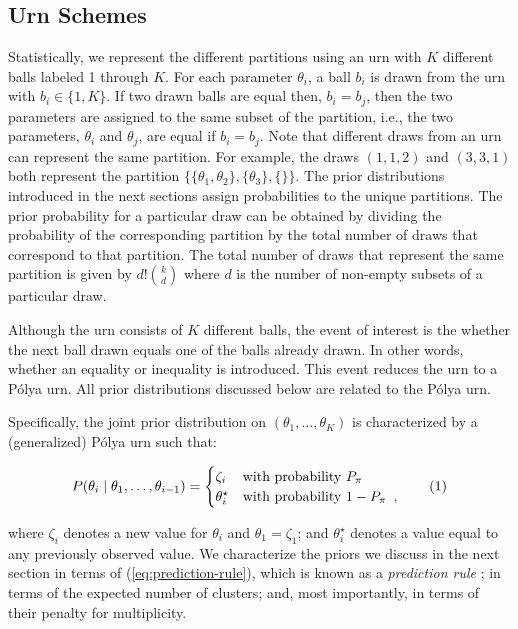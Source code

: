 \documentclass[11pt,a4paper]{article}
\theoremstyle{definition} %
\theoremstyle{case}
\newcommand{\numberthis}{\addtocounter{equation}{1}\tag{\theequation}}
\begin{document}
\subsection{Urn Schemes}
Statistically, we represent the different partitions using an urn with $K$ different balls labeled 1 through $K$. For each parameter $\theta_i$, a ball $b_i$ is drawn from the urn with $b_i \in \{1,K\}$. If two drawn balls are equal then, $b_i = b_j$, then the two parameters are assigned to the same subset of the partition, i.e., the two parameters, $\theta_i$ and $\theta_j$, are equal if $b_i = b_j$. Note that different draws from an urn can represent the same partition. For example, the draws $(1, 1, 2)$ and $(3, 3, 1)$ both represent the partition $\{\{\theta_1, \theta_2\}, \{\theta_3\}, \{\}\}$. The prior distributions introduced in the next sections assign probabilities to the unique partitions. The prior probability for a particular draw can be obtained by dividing the probability of the corresponding partition by the total number of draws that correspond to that partition. The total number of draws that represent the same partition is given by $d!\binom{k}{d}$ where $d$ is the number of non-empty subsets of a particular draw. 

Although the urn consists of $K$ different balls, the event of interest is the whether the next ball drawn equals one of the balls already drawn. In other words, whether an equality or inequality is introduced. This event reduces the urn to a P\'{o}lya urn. All prior distributions discussed below are related to the P\'{o}lya urn.

Specifically, the joint prior distribution on $(\theta_1, \ldots, \theta_K)$ is characterized by a (generalized) P\'{o}lya urn such that:

\begin{equation} \label{eq:prediction-rule}
    P(\theta_i \mid \theta_1, \ldots, \theta_{i - 1}) = \begin{cases}
    \zeta_i & \text{with probability } P_{\pi} \\
    \theta_i^{\star} & \text{with probability }  1- P_{\pi} \enspace ,
    \end{cases} \numberthis
\end{equation}

where $\zeta_i$ denotes a new value for $\theta_i$ and $\theta_1 = \zeta_1$; and $\theta_i^{\star}$ denotes a value equal to any previously observed value. We characterize the priors we discuss in the next section in terms of (\ref{eq:prediction-rule}), which is known as a \textit{prediction rule} \parencite[e.g.,][]{ishwaran2001gibbs}; in terms of the expected number of clusters; and, most importantly, in terms of their penalty for multiplicity.
\end{document}
